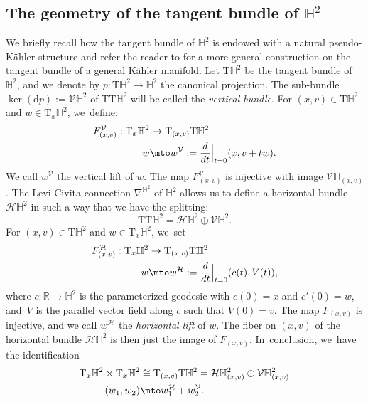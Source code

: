 \subsection{The geometry of the tangent bundle of \texorpdfstring{$\mathbb{H}^2$}{H2}}
\label{The_geometry_of_the_tangent bundle}
We briefly recall how the tangent bundle of $\mathbb{H}^2$ is endowed with a natural pseudo-Kähler structure and refer the reader to \cite{canonical_pseudo} for a more general construction on the tangent bundle of a general Kähler manifold. Let $\mathrm{T}\mathbb{H}^2$ be the tangent bundle of $\mathbb{H}^2$, and we denote by $p:\mathrm{T}\mathbb{H}^2\to\mathbb{H}^2$ the canonical projection. The sub-bundle $\ker(\mathrm{d}p) := \mathcal{V}\mathbb{H}^2$ of $\mathrm{T}\mathrm{T}\mathbb{H}^2$ will be called the \emph{vertical bundle}. For $(x,v)\in \mathrm{T}\mathbb{H}^2$ and $w\in\mathrm{T}_x\mathbb{H}^2$, we~define:
\[
\begin{aligned}
F^{\mathcal{V}}_{(x,v)}: \mathrm{T}_x\mathbb{H}^2 & \to \mathrm{T}_{(x,v)}\mathrm{T}\mathbb{H}^2 \\
w &\mto w^{\mathcal{V}}:=\frac{d}{dt}\Big\lvert_{t=0} (x,v+tw).
\end{aligned}
\]
We call $w^{\mathcal{V}}$ the vertical lift of $w$. The map $F^{\mathcal{V}}_{(x,v)}$ is injective with image $\mathcal{V}\mathbb{H}_{(x,v)}$.
The Levi-Civita connection $\nabla^{\mathbb{H}^2}$ of $\mathbb{H}^2$ allows us to define a horizontal bundle $\mathcal{H}\mathbb{H}^2$ in such a way that we have the splitting:
\[
\mathrm{T}\mathrm{T}\mathbb{H}^2=\mathcal{H}\mathbb{H}^2\oplus \mathcal{V}\mathbb{H}^2.
\]
For $(x,v)\in \mathrm{T}\mathbb{H}^2$ and $w\in\mathrm{T}_x\mathbb{H}^2$, we~set
\[
\begin{aligned}
F_{(x,v)}^{\mathcal{H}}:\mathrm{T}_x\mathbb{H}^2 & \to \mathrm{T}_{(x,v)}\mathrm{T}\mathbb{H}^2 \\
w &\mto w^{\mathcal{H}}:=\frac{d}{dt}\Big\lvert_{t=0} (c(t),V(t)),
\end{aligned}
\]
where $c:\mathbb{R}\to\mathbb{H}^2$ is the parameterized geodesic with $c(0)=x$ and $c'(0)=w$, and~$V$ is the parallel vector field along $c$ such that $V(0)=v$. The map $F_{(x,v)}$ is injective, and we call $w^{\mathcal{H}}$ the \emph{horizontal lift} of $w$. The fiber on $(x,v)$ of the horizontal bundle $\mathcal{H}\mathbb{H}^2$ is then just the image of $F_{(x,v)}$. In~conclusion, we~have the identification
\begin{equation}\label{splittangent}
\begin{aligned}
\mathrm{T}_x\mathbb{H}^2\times \mathrm{T}_x\mathbb{H}^2 & \cong \mathrm{T}_{(x,v)}\mathrm{T}\mathbb{H}^2=\mathcal{H}\mathbb{H}^2_{(x,v)}\oplus \mathcal{V}\mathbb{H}^2_{(x,v)} \\
(w_1,w_2) & \mto w_1^{\mathcal{H}}+w_2^{\mathcal{V}}.
\end{aligned}
\end{equation}

